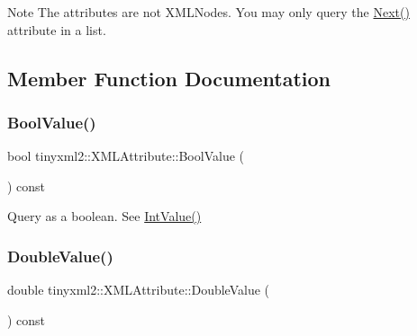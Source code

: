 \begin{DoxyNote}{Note}
The attributes are not X\+M\+L\+Nodes. You may only query the \mbox{\hyperlink{classtinyxml2_1_1_x_m_l_attribute_aee53571b21e7ce5421eb929523a8bbe6}{Next()}} attribute in a list. 
\end{DoxyNote}


\subsection{Member Function Documentation}
\mbox{\label{classtinyxml2_1_1_x_m_l_attribute_a98ce5207344ad33a265b0422addae1ff}} 
\subsubsection{\texorpdfstring{Bool\+Value()}{BoolValue()}}
{\footnotesize\ttfamily bool tinyxml2\+::\+X\+M\+L\+Attribute\+::\+Bool\+Value (\begin{DoxyParamCaption}{ }\end{DoxyParamCaption}) const\hspace{0.3cm}{\ttfamily [inline]}}



Query as a boolean. See \mbox{\hyperlink{classtinyxml2_1_1_x_m_l_attribute_adfa2433f0fdafd5c3880936de9affa80}{Int\+Value()}} 

\mbox{\label{classtinyxml2_1_1_x_m_l_attribute_a4aa73513f54ff0087d3e804f0f54e30f}} 
\subsubsection{\texorpdfstring{Double\+Value()}{DoubleValue()}}
{\footnotesize\ttfamily double tinyxml2\+::\+X\+M\+L\+Attribute\+::\+Double\+Value (\begin{DoxyParamCaption}{ }\end{DoxyParamCaption}) const\hspace{0.3cm}{\ttfamily [inline]}}



